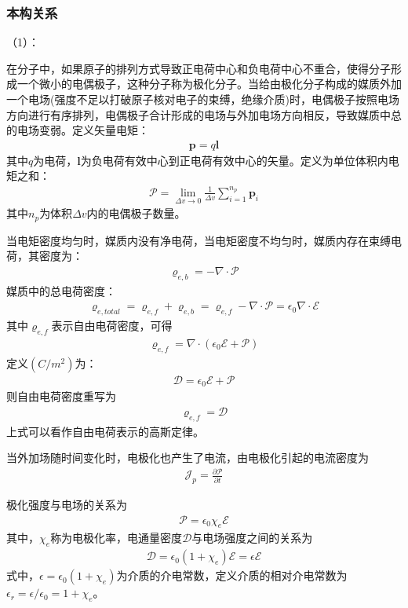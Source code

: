 \documentclass{article}
\numberwithin{equation}{section}
\renewcommand{\vec}[1]{\boldsymbol{#1}}
\begin{document}
\subsubsection{本构关系}
（1）\textbf{\color{blue}{电极化}}：\par
在分子中，如果原子的排列方式导致正电荷中心和负电荷中心不重合，使得分子形成一个微小的电偶极子，这种分子称为极化分子。当给由极化分子构成的媒质外加一个电场(强度不足以打破原子核对电子的束缚，绝缘介质)时，电偶极子按照电场方向进行有序排列，电偶极子合计形成的电场与外加电场方向相反，导致媒质中总的电场变弱。定义矢量电矩：
\begin{align}
    \vec{p}=q\vec{l}
\end{align}
其中$q$为电荷，$\vec{l}$为负电荷有效中心到正电荷有效中心的矢量。定义\textbf{\color{blue}{极化强度}}为单位体积内电矩之和：
\begin{align}
    \vec{\mathcal{P}}=\lim_{\Delta v \to 0}\frac{1}{\Delta v}\sum_{i=1}^{n_p}\vec{p}_i
\end{align}
其中$n_p$为体积$\Delta v$内的电偶极子数量。
\par
当电矩密度均匀时，媒质内没有净电荷，当电矩密度不均匀时，媒质内存在束缚电荷，其密度为：
\begin{align}
    \varrho _{e,b}=-\nabla \cdot \vec{\mathcal{P}}
\end{align}
媒质中的总电荷密度：
\begin{align}
    \varrho _{e,total}=\varrho _{e,f}+\varrho _{e,b}=\varrho _{e,f}-\nabla \cdot \vec{\mathcal{P}}=\epsilon_0 \nabla \cdot \vec{\mathcal{E}}
\end{align}
其中$\varrho _{e,f}$表示自由电荷密度，可得
\begin{align}
    \varrho _{e,f}=\nabla \cdot (\epsilon_0 \vec{\mathcal{E}}+\vec{\mathcal{P}})
\end{align}
定义\textbf{\color{blue}{电通量密度}}$(C/m^2)$为：
\begin{align}
    \label{eq:eq12}
    \vec{\mathcal{D}}=\epsilon_0 \vec{\mathcal{E}}+\vec{\mathcal{P}}
\end{align}
则自由电荷密度重写为
\begin{align}
    \varrho _{e,f}=\vec{\mathcal{D}}
\end{align}
上式可以看作自由电荷表示的高斯定律。\par
当外加场随时间变化时，电极化也产生了电流，由电极化引起的电流密度为
\begin{align}
    \vec{\mathcal{J}}_p=\frac{\partial \vec{\mathcal{P}}}{\partial t}
\end{align}
\par
极化强度与电场的关系为
\begin{align}
    \vec{\mathcal{P}}=\epsilon_0 \chi_e \vec{\mathcal{E}}
\end{align}
其中，$\chi_e$称为电极化率，电通量密度$\vec{\mathcal{D}}$与电场强度之间的关系为
\begin{align}
    \vec{\mathcal{D}}=\epsilon_0 (1+\chi_e) \vec{\mathcal{E}}=\epsilon\vec{\mathcal{E}}
\end{align}
式中，$\epsilon=\epsilon_0 (1+\chi_e)$为介质的介电常数，定义介质的相对介电常数为$\epsilon_r=\epsilon / \epsilon_0 =1+\chi_e$。\par
\end{document}

